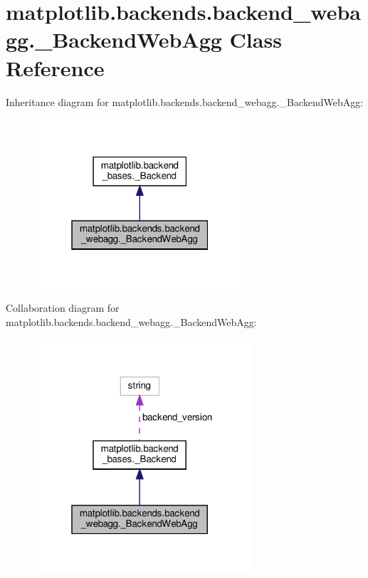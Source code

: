 \hypertarget{classmatplotlib_1_1backends_1_1backend__webagg_1_1__BackendWebAgg}{}\section{matplotlib.\+backends.\+backend\+\_\+webagg.\+\_\+\+Backend\+Web\+Agg Class Reference}
\label{classmatplotlib_1_1backends_1_1backend__webagg_1_1__BackendWebAgg}


Inheritance diagram for matplotlib.\+backends.\+backend\+\_\+webagg.\+\_\+\+Backend\+Web\+Agg\+:
\nopagebreak
\begin{figure}[H]
\begin{center}
\leavevmode
\includegraphics[width=223pt]{classmatplotlib_1_1backends_1_1backend__webagg_1_1__BackendWebAgg__inherit__graph}
\end{center}
\end{figure}


Collaboration diagram for matplotlib.\+backends.\+backend\+\_\+webagg.\+\_\+\+Backend\+Web\+Agg\+:
\nopagebreak
\begin{figure}[H]
\begin{center}
\leavevmode
\includegraphics[width=229pt]{classmatplotlib_1_1backends_1_1backend__webagg_1_1__BackendWebAgg__coll__graph}
\end{center}
\end{figure}

